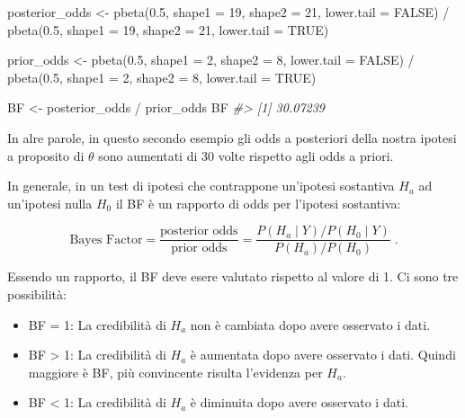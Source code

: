\documentclass[
  11pt,
  italian,
  a4paper,
  extrafontsizes,onecolumn,openright
  ]{memoir}
\newenvironment{Shaded}{\begin{snugshade}}{\end{snugshade}}
\newcommand{\AttributeTok}[1]{\textcolor[rgb]{0.77,0.63,0.00}{#1}}
\newcommand{\CommentTok}[1]{\textcolor[rgb]{0.56,0.35,0.01}{\textit{#1}}}
\newcommand{\ConstantTok}[1]{\textcolor[rgb]{0.00,0.00,0.00}{#1}}
\newcommand{\DecValTok}[1]{\textcolor[rgb]{0.00,0.00,0.81}{#1}}
\newcommand{\FloatTok}[1]{\textcolor[rgb]{0.00,0.00,0.81}{#1}}
\newcommand{\FunctionTok}[1]{\textcolor[rgb]{0.00,0.00,0.00}{#1}}
\newcommand{\NormalTok}[1]{#1}
\newcommand{\OtherTok}[1]{\textcolor[rgb]{0.56,0.35,0.01}{#1}}
\newcommand{\SpecialCharTok}[1]{\textcolor[rgb]{0.00,0.00,0.00}{#1}}
\providecommand{\tightlist}{%
  \setlength{\itemsep}{0pt}\setlength{\parskip}{0pt}}
\begin{document}
\begin{Shaded}
\begin{Highlighting}[]
\NormalTok{posterior\_odds }\OtherTok{\textless{}{-}}
  \FunctionTok{pbeta}\NormalTok{(}\FloatTok{0.5}\NormalTok{, }\AttributeTok{shape1 =} \DecValTok{19}\NormalTok{, }\AttributeTok{shape2 =} \DecValTok{21}\NormalTok{, }\AttributeTok{lower.tail =} \ConstantTok{FALSE}\NormalTok{) }\SpecialCharTok{/}
    \FunctionTok{pbeta}\NormalTok{(}\FloatTok{0.5}\NormalTok{, }\AttributeTok{shape1 =} \DecValTok{19}\NormalTok{, }\AttributeTok{shape2 =} \DecValTok{21}\NormalTok{, }\AttributeTok{lower.tail =} \ConstantTok{TRUE}\NormalTok{)}

\NormalTok{prior\_odds }\OtherTok{\textless{}{-}}
  \FunctionTok{pbeta}\NormalTok{(}\FloatTok{0.5}\NormalTok{, }\AttributeTok{shape1 =} \DecValTok{2}\NormalTok{, }\AttributeTok{shape2 =} \DecValTok{8}\NormalTok{, }\AttributeTok{lower.tail =} \ConstantTok{FALSE}\NormalTok{) }\SpecialCharTok{/}
    \FunctionTok{pbeta}\NormalTok{(}\FloatTok{0.5}\NormalTok{, }\AttributeTok{shape1 =} \DecValTok{2}\NormalTok{, }\AttributeTok{shape2 =} \DecValTok{8}\NormalTok{, }\AttributeTok{lower.tail =} \ConstantTok{TRUE}\NormalTok{)}

\NormalTok{BF }\OtherTok{\textless{}{-}}\NormalTok{ posterior\_odds }\SpecialCharTok{/}\NormalTok{ prior\_odds}
\NormalTok{BF}
\CommentTok{\#\textgreater{} [1] 30.07239}
\end{Highlighting}
\end{Shaded}

\noindent
In alre parole, in questo secondo esempio gli odds a posteriori della nostra ipotesi a proposito di \(\theta\) sono aumentati di 30 volte rispetto agli odds a priori.

In generale, in un test di ipotesi che contrappone un'ipotesi sostantiva \(H_a\) ad un'ipotesi nulla \(H_0\) il BF è un rapporto di odds per l'ipotesi sostantiva:

\[
\text{Bayes Factor}
= \frac{\text{posterior odds}}{\text{prior odds}}
= \frac{P(H_a \mid Y) / P(H_0 \mid Y)}{P(H_a) / P(H_0)}
 \; .
\]

\noindent
Essendo un rapporto, il BF deve esere valutato rispetto al valore di 1. Ci sono tre possibilità:

\begin{itemize}
\tightlist
\item
  BF = 1: La credibilità di \(H_a\) non è cambiata dopo avere osservato i dati.
\item
  BF \textgreater{} 1: La credibilità di \(H_a\) è aumentata dopo avere osservato i dati. Quindi maggiore è BF, più convincente risulta l'evidenza per \(H_a\).
\item
  BF \textless{} 1: La credibilità di \(H_a\) è diminuita dopo avere osservato i dati.
\end{itemize}
\end{document}
